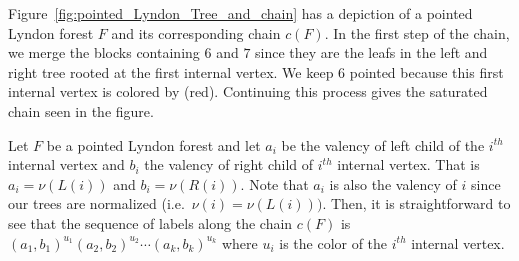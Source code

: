  Figure~\ref{fig:pointed_Lyndon_Tree_and_chain} has  a depiction of a pointed Lyndon forest $F$ and its corresponding chain $c(F)$.  In the first step of the chain, we merge the blocks containing $6$ and $7$ since they are the leafs in the left and right tree rooted at the first internal vertex. We keep $6$ pointed because this first internal vertex is colored by  (red). Continuing this process gives the saturated chain seen in the figure.

Let $F$ be a pointed Lyndon forest and let $a_i$ be the valency of left child of the $i^{th}$ internal vertex  and $b_i$ the valency of right child of $i^{th}$  internal vertex.  That is $a_i = \nu(L(i))$ and $b_i =\nu(R(i))$. Note that $a_i$ is also the valency of $i$ since our trees are normalized (i.e.~$\nu(i) =\nu(L(i)))$.  Then, it is straightforward to see that the sequence of labels along the chain $c(F)$ is $(a_1,b_1)^{u_1}(a_2,b_2)^{u_2}\cdots (a_{k},b_{k})^{u_{k}}$ where $u_i$ is the color of the $i^{th}$ internal vertex.

